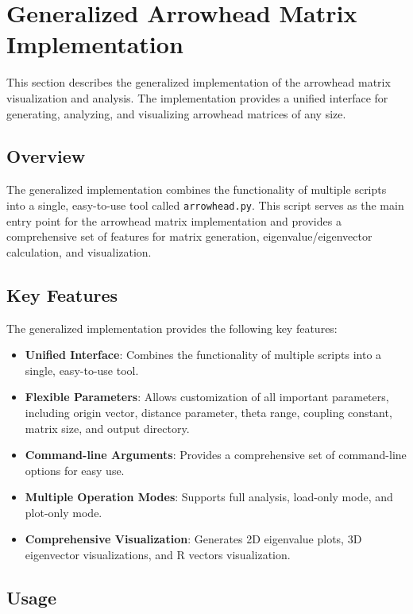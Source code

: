 
\newpage
\section{Generalized Arrowhead Matrix Implementation}

This section describes the generalized implementation of the arrowhead matrix visualization and analysis. The implementation provides a unified interface for generating, analyzing, and visualizing arrowhead matrices of any size.

\subsection{Overview}

The generalized implementation combines the functionality of multiple scripts into a single, easy-to-use tool called \texttt{arrowhead.py}. This script serves as the main entry point for the arrowhead matrix implementation and provides a comprehensive set of features for matrix generation, eigenvalue/eigenvector calculation, and visualization.

\subsection{Key Features}

The generalized implementation provides the following key features:

\begin{itemize}
    \item \textbf{Unified Interface}: Combines the functionality of multiple scripts into a single, easy-to-use tool.
    \item \textbf{Flexible Parameters}: Allows customization of all important parameters, including origin vector, distance parameter, theta range, coupling constant, matrix size, and output directory.
    \item \textbf{Command-line Arguments}: Provides a comprehensive set of command-line options for easy use.
    \item \textbf{Multiple Operation Modes}: Supports full analysis, load-only mode, and plot-only mode.
    \item \textbf{Comprehensive Visualization}: Generates 2D eigenvalue plots, 3D eigenvector visualizations, and R vectors visualization.
\end{itemize}

\subsection{Usage}

